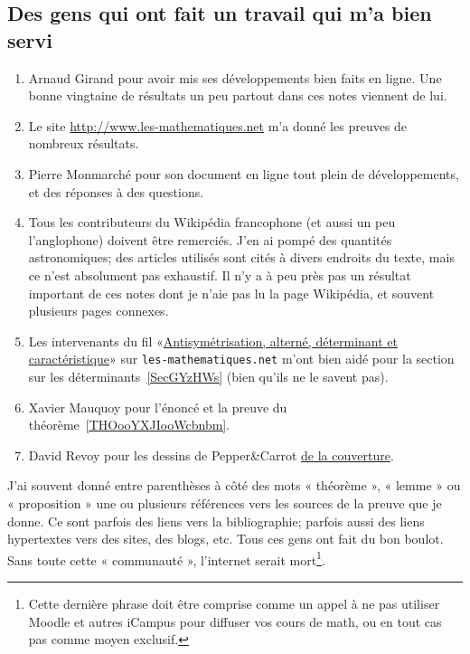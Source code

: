 \subsection{Des gens qui ont fait un travail qui m'a bien servi}

\begin{enumerate}
    \item
	Arnaud Girand pour avoir mis ses développements bien faits en ligne. Une bonne vingtaine de résultats un peu partout dans ces notes viennent de lui.
    \item
	Le site \url{http://www.les-mathematiques.net} m'a donné les preuves de nombreux résultats.
    \item
	Pierre Monmarché pour son document en ligne tout plein de développements, et des réponses à des questions.
    \item
        Tous les contributeurs du Wikipédia francophone (et aussi un peu l'anglophone) doivent être remerciés. J'en ai pompé des quantités astronomiques; des articles utilisés sont cités à divers endroits du texte, mais ce n'est absolument pas exhaustif. Il n'y a à peu près pas un résultat important de ces notes dont je n'aie pas lu la page Wikipédia, et souvent plusieurs pages connexes.
    \item
        Les intervenants du fil «\href{http://www.les-mathematiques.net/phorum/read.php?2,302266}{Antisymétrisation, alterné, déterminant et caractéristique}» sur \texttt{les-mathematiques.net} m'ont bien aidé pour la section sur les déterminants~\ref{SecGYzHWs} (bien qu'ils ne le savent pas).
    \item
        Xavier Mauquoy pour l'énoncé et la preuve du théorème~\ref{THOooYXJIooWcbnbm}.
    \item
        David Revoy pour les dessins de Pepper\&Carrot \href{https://www.peppercarrot.com/fr/article285/episode-8-pepper-s-birthday-party}{de la couverture}.
\end{enumerate}

J'ai souvent donné entre parenthèses à côté des mots « théorème », « lemme » ou « proposition » une ou plusieurs références vers les sources de la preuve que je donne. Ce sont parfois des liens vers la bibliographie; parfois aussi des liens hypertextes vers des sites, des blogs, etc. Tous ces gens ont fait du bon boulot. Sans toute cette « communauté », l'internet serait mort\footnote{Cette dernière phrase doit être comprise comme un appel à ne pas utiliser Moodle et autres iCampus pour diffuser vos cours de math, ou en tout cas pas comme moyen exclusif.}.

